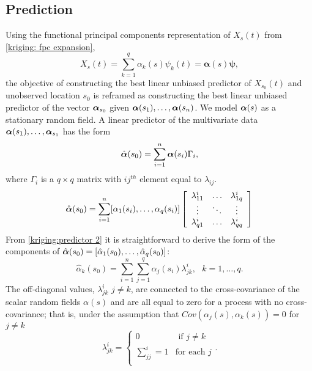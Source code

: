 \subsection{Prediction} 

\label{sec:functional_kriging_predictor}

Using the functional principal components representation of $X_s(t)$ from \eqref{kriging: fpc expansion},
\begin{equation}
	X_{s}(t) = \sum_{k=1}^{q} \alpha_k(s)\psi_k(t) = \boldsymbol{\alpha}(s)\boldsymbol{\psi}, 
\end{equation}
the objective of constructing the best linear unbiased predictor of $X_{s_0}(t)$ and unobserved location $s_0$ is reframed as constructing the best linear unbiased predictor of the vector $\boldsymbol\alpha_{s_0}$ given $\boldsymbol\alpha(s_1), \dots, \boldsymbol\alpha(s_n)$. We model $\boldsymbol\alpha(s)$ as a stationary random field. A linear predictor of the multivariate data $\boldsymbol\alpha(s_1), \dots, \boldsymbol\alpha_{s_1}$ has the form
\begin{equation}
	\hat{\boldsymbol\alpha}(s_0) = \sum_{i=1}^n \boldsymbol\alpha(s_i)\Gamma_i, \label{kriging:predictor}
\end{equation}
where $\Gamma_i$ is a $q \times q$ matrix with $ij^{th}$ element equal to $\lambda_{ij}$. 
\begin{equation}\label{kriging:predictor 2}
		\hat{\boldsymbol\alpha}(s_0) = \sum_{i=1}^n [\alpha_1(s_i), \dots, \alpha_q(s_i)] 
		\left[ 
			\begin{array}{ccc}
				\lambda^i_{11} & \dots & \lambda^i_{1q}\\
				\vdots & \ddots & \vdots \\
				\lambda^i_{q1} & \dots & \lambda^i_{qq}
			\end{array}
		\right]
\end{equation}
From \eqref{kriging:predictor 2} it is straightforward to derive the form of the components of $\hat{\boldsymbol\alpha}(s_0)=[\hat{\alpha}_1(s_0), \dots, \hat{\alpha}_q(s_0)]$:
\begin{equation}
	\hat{\alpha}_k(s_0) = \sum_{i=1}^n\sum_{j=1}^q\alpha_j(s_i)\lambda^i_{jk}, \mbox{ } k = 1, \dots, q.
\end{equation}
The off-diagonal values, $\lambda^i_{jk}$ $j \neq k$, are connected to the cross-covariance of the scalar random fields $\alpha(s)$ and are all equal to zero for a process with no cross-covariance; that is, under the assumption that $Cov(\alpha_j(s), \alpha_k(s)) = 0$ for $j \neq k$
\begin{equation}
	\lambda^i_{jk} = \begin{cases}
														0 & \text{ if } j \neq k\\
														\sum_{jj}^i = 1 & \text{for each $j$}\\
 										\end{cases}.
\end{equation}

